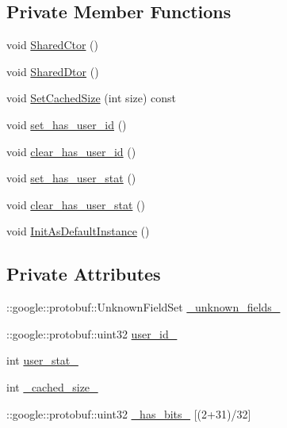 \subsection*{Private Member Functions}
\begin{DoxyCompactItemize}
\item 
void \hyperlink{class_i_m_1_1_base_define_1_1_server_user_stat_a7eba91b5437da25c2c1f91e6c60bc505}{Shared\+Ctor} ()
\item 
void \hyperlink{class_i_m_1_1_base_define_1_1_server_user_stat_ad95b4f31053adddfa9f8447433583a60}{Shared\+Dtor} ()
\item 
void \hyperlink{class_i_m_1_1_base_define_1_1_server_user_stat_ab7c626f7a7095cd53232712df08a5db7}{Set\+Cached\+Size} (int size) const 
\item 
void \hyperlink{class_i_m_1_1_base_define_1_1_server_user_stat_a6da5d0def87f26648add0ae89c711f64}{set\+\_\+has\+\_\+user\+\_\+id} ()
\item 
void \hyperlink{class_i_m_1_1_base_define_1_1_server_user_stat_a4c612303e306c3f5e43c43c0622be6fa}{clear\+\_\+has\+\_\+user\+\_\+id} ()
\item 
void \hyperlink{class_i_m_1_1_base_define_1_1_server_user_stat_aaa401a9ad6b14219b2e0d5a2c1dd1302}{set\+\_\+has\+\_\+user\+\_\+stat} ()
\item 
void \hyperlink{class_i_m_1_1_base_define_1_1_server_user_stat_a2d85427008f453b7dac8d6432ab97306}{clear\+\_\+has\+\_\+user\+\_\+stat} ()
\item 
void \hyperlink{class_i_m_1_1_base_define_1_1_server_user_stat_af6d935487a632ed5c2a6e94d432f65e3}{Init\+As\+Default\+Instance} ()
\end{DoxyCompactItemize}
\subsection*{Private Attributes}
\begin{DoxyCompactItemize}
\item 
\+::google\+::protobuf\+::\+Unknown\+Field\+Set \hyperlink{class_i_m_1_1_base_define_1_1_server_user_stat_aafed0a8ce3c7cf8c8a363de59f4dbdd9}{\+\_\+unknown\+\_\+fields\+\_\+}
\item 
\+::google\+::protobuf\+::uint32 \hyperlink{class_i_m_1_1_base_define_1_1_server_user_stat_a561b5a4310823d1e0e11558fc635ade7}{user\+\_\+id\+\_\+}
\item 
int \hyperlink{class_i_m_1_1_base_define_1_1_server_user_stat_aae7569096dc97fa83c608384dcdf8b2d}{user\+\_\+stat\+\_\+}
\item 
int \hyperlink{class_i_m_1_1_base_define_1_1_server_user_stat_a7a6af45473072d3570e377f14c312125}{\+\_\+cached\+\_\+size\+\_\+}
\item 
\+::google\+::protobuf\+::uint32 \hyperlink{class_i_m_1_1_base_define_1_1_server_user_stat_ac16048e3e8a22b91669eaa0cedbda1f7}{\+\_\+has\+\_\+bits\+\_\+} \mbox{[}(2+31)/32\mbox{]}
\end{DoxyCompactItemize}
